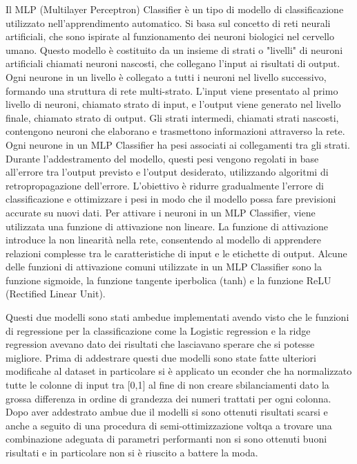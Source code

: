\documentclass[italian,12pt,a4paper]{article}
\begin{document}
    Il MLP (Multilayer Perceptron) Classifier è un tipo di modello di classificazione utilizzato nell'apprendimento automatico. Si basa sul concetto di reti neurali artificiali, che sono ispirate al funzionamento dei neuroni biologici nel cervello umano. Questo modello è costituito da un insieme di strati o "livelli" di neuroni artificiali chiamati neuroni nascosti, che collegano l'input ai risultati di output. Ogni neurone in un livello è collegato a tutti i neuroni nel livello successivo, formando una struttura di rete multi-strato. L'input viene presentato al primo livello di neuroni, chiamato strato di input, e l'output viene generato nel livello finale, chiamato strato di output. Gli strati intermedi, chiamati strati nascosti, contengono neuroni che elaborano e trasmettono informazioni attraverso la rete. Ogni neurone in un MLP Classifier ha pesi associati ai collegamenti tra gli strati. Durante l'addestramento del modello, questi pesi vengono regolati in base all'errore tra l'output previsto e l'output desiderato, utilizzando algoritmi di retropropagazione dell'errore. L'obiettivo è ridurre gradualmente l'errore di classificazione e ottimizzare i pesi in modo che il modello possa fare previsioni accurate su nuovi dati. Per attivare i neuroni in un MLP Classifier, viene utilizzata una funzione di attivazione non lineare. La funzione di attivazione introduce la non linearità nella rete, consentendo al modello di apprendere relazioni complesse tra le caratteristiche di input e le etichette di output. Alcune delle funzioni di attivazione comuni utilizzate in un MLP Classifier sono la funzione sigmoide, la funzione tangente iperbolica (tanh) e la funzione ReLU (Rectified Linear Unit).
    
    Questi due modelli sono stati ambedue implementati avendo visto che le funzioni di regressione per la classificazione come la Logistic regression e la ridge regression avevano dato dei risultati che lasciavano sperare che si potesse migliore. Prima di addestrare questi due modelli sono state fatte ulteriori modificahe al dataset in particolare si è applicato un econder che ha normalizzato tutte le colonne di input tra [0,1] al fine di non creare sbilanciamenti dato la grossa differenza in ordine di grandezza dei numeri trattati per ogni colonna. Dopo aver addestrato ambue due il modelli si sono ottenuti risultati scarsi e anche a seguito di una procedura di semi-ottimizzazione voltqa a trovare una combinazione adeguata di parametri performanti non si sono ottenuti buoni risultati e in particolare non si è riuscito a battere la moda.
    
\end{document}
